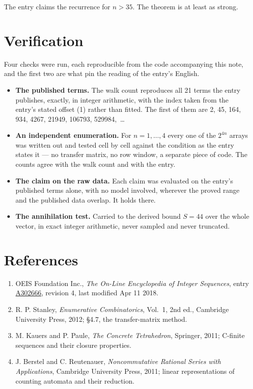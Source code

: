 \documentclass[11pt]{article}
\theoremstyle{definition}
\begin{document}
The entry claims the recurrence for $n > 35$. The theorem is at least as strong.

\section{Verification}

Four checks were run, each reproducible from the code accompanying this note, and the first two are what pin the reading of the entry's English.

\begin{itemize}

\item {\bfseries The published terms.} The walk count reproduces all 21 terms the entry publishes, exactly, in integer arithmetic, with the index taken from the entry's stated offset (1) rather than fitted. The first of them are 2, 45, 164, 934, 4267, 21949, 106793, 529984,~\dots

\item {\bfseries An independent enumeration.} For $n = 1,\dots,4$ every one of the $2^{4n}$ arrays was written out and tested cell by cell against the condition as the entry states it --- no transfer matrix, no row window, a separate piece of code. The counts agree with the walk count and with the entry.

\item {\bfseries The claim on the raw data.} Each claim was evaluated on the entry's published terms alone, with no model involved, wherever the proved range and the published data overlap. It holds there.

\item {\bfseries The annihilation test.} Carried to the derived bound $S = 44$ over the whole vector, in exact integer arithmetic, never sampled and never truncated.

\end{itemize}

\section{References}

\begin{enumerate}

\item OEIS Foundation Inc., \emph{The On-Line Encyclopedia of Integer Sequences}, entry \href{https://oeis.org/A302666}{A302666}, revision 4, last modified Apr 11 2018.

\item R. P. Stanley, \emph{Enumerative Combinatorics}, Vol.~1, 2nd ed., Cambridge University Press, 2012; \S4.7, the transfer-matrix method.

\item M. Kauers and P. Paule, \emph{The Concrete Tetrahedron}, Springer, 2011; C-finite sequences and their closure properties.

\item J. Berstel and C. Reutenauer, \emph{Noncommutative Rational Series with Applications}, Cambridge University Press, 2011; linear representations of counting automata and their reduction.

\end{enumerate}
\end{document}
